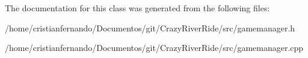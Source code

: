 The documentation for this class was generated from the following files\-:\begin{DoxyCompactItemize}
\item 
/home/cristianfernando/\-Documentos/git/\-Crazy\-River\-Ride/src/gamemanager.\-h\item 
/home/cristianfernando/\-Documentos/git/\-Crazy\-River\-Ride/src/gamemanager.\-cpp\end{DoxyCompactItemize}
